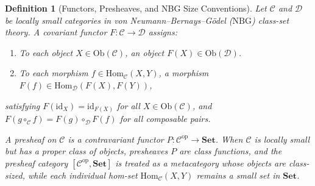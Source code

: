 \documentclass{article}
\newtheorem{definition}{Definition}
\newcommand{\Set}{\mathbf{Set}}
\newcommand{\Hom}{\mathrm{Hom}}
\newcommand{\Ob}{\mathrm{Ob}}
\newcommand{\op}{\mathrm{op}}
\begin{document}
\begin{definition}[Functors, Presheaves, and NBG Size Conventions]
Let $\mathcal{C}$ and $\mathcal{D}$ be locally small categories in von Neumann--Bernays--G\"odel ($\mathrm{NBG}$) class-set theory.
A \emph{covariant functor} $F : \mathcal{C} \to \mathcal{D}$ assigns:
\begin{enumerate}
    \item To each object $X \in \Ob(\mathcal{C})$, an object $F(X) \in \Ob(\mathcal{D})$.
    \item To each morphism $f \in \Hom_{\mathcal{C}}(X, Y)$, a morphism $F(f) \in \Hom_{\mathcal{D}}(F(X), F(Y))$,
\end{enumerate}
satisfying $F(\mathrm{id}_X) = \mathrm{id}_{F(X)}$ for all $X \in \Ob(\mathcal{C})$, and $F(g \circ_{\mathcal{C}} f) = F(g) \circ_{\mathcal{D}} F(f)$ for all composable pairs.

A \emph{presheaf} on $\mathcal{C}$ is a contravariant functor $P : \mathcal{C}^\op \to \Set$.
When $\mathcal{C}$ is locally small but has a proper class of objects, presheaves $P$ are class functions, and the presheaf category $[\mathcal{C}^\op, \Set]$ is treated as a metacategory whose objects are class-sized, while each individual hom-set $\Hom_{\mathcal{C}}(X, Y)$ remains a small set in $\Set$.
\end{definition}
\end{document}
